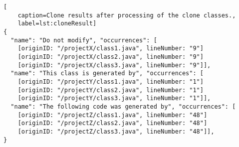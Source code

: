
\begin{lstlisting}[
	caption=Clone results after processing of the clone classes.,
	label=lst:cloneResult]
{
  "name": "Do not modify", "occurrences": [
    [originID: "/projectX/class1.java", lineNumber: "9"]
    [originID: "/projectX/class2.java", lineNumber: "9"]
    [originID: "/projectX/class3.java", lineNumber: "9"]],
  "name": "This class is generated by", "occurrences": [
    [originID: "/projectY/class1.java", lineNumber: "1"]
    [originID: "/projectY/class2.java", lineNumber: "1"]
    [originID: "/projectY/class3.java", lineNumber: "1"]],
  "name": "The following code was generated by", "occurrences": [
    [originID: "/projectZ/class1.java", lineNumber: "48"]
    [originID: "/projectZ/class2.java", lineNumber: "48"]
    [originID: "/projectZ/class3.java", lineNumber: "48"]],
}
\end{lstlisting}